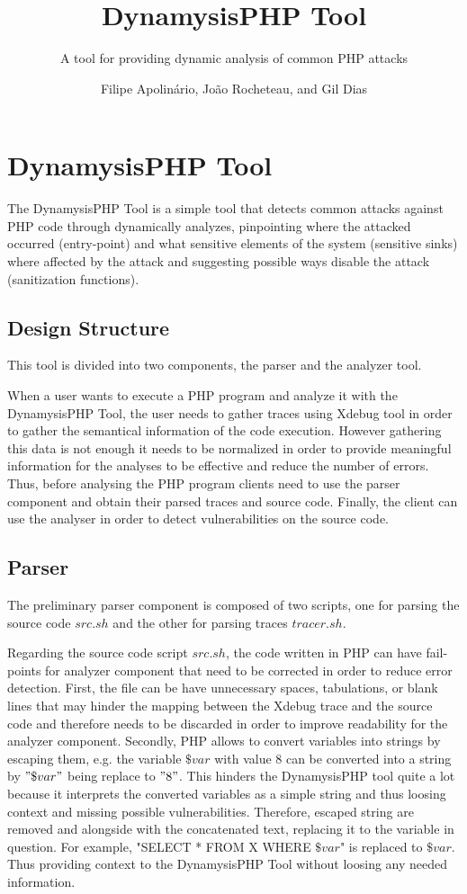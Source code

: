 \documentclass{./llncs2e/llncs}
\author{Filipe Apolinário, João Rocheteau, and Gil Dias}
\institute{Instituto Superior Técnico}
\begin{document}
\title{DynamysisPHP Tool}
\subtitle{A tool for providing dynamic analysis of common PHP attacks}

\maketitle
\section{DynamysisPHP Tool}

The DynamysisPHP Tool is a simple tool that detects common attacks against PHP code through dynamically analyzes, pinpointing where the attacked occurred (entry-point) and what sensitive elements of the system (sensitive sinks) where affected by the attack and suggesting possible ways disable the attack (sanitization functions). 

\subsection{Design Structure}
This tool is divided into two components, the parser and the analyzer tool.

When a user wants to execute a PHP program and analyze it with the DynamysisPHP Tool, the user needs to gather traces using Xdebug tool in order to gather the semantical information of the code execution. However gathering this data is not enough it needs to be normalized in order to provide meaningful information for the analyses to be effective and reduce the number of errors. Thus, before analysing the PHP program clients need to use the parser component and obtain their parsed traces and source code. Finally, the client can use the analyser in order to detect vulnerabilities on the source code.

\subsection{Parser}
The preliminary parser component is composed of two scripts, one for parsing the source code $src.sh$ and the other for parsing traces $tracer.sh$.

Regarding the source code script $src.sh$, the code written in PHP can have fail-points for analyzer component that need to be corrected in order to reduce error detection. First, the file can be have unnecessary spaces, tabulations, or blank lines that may hinder the mapping between the Xdebug trace and the source code and therefore needs to be discarded in order to improve readability for the analyzer component. Secondly, PHP allows to convert variables into strings by escaping them, e.g. the variable $\$var$ with value $8$ can be converted into a string by $"\$var"$ being replace to $"8"$. This hinders the DynamysisPHP tool quite a lot because it interprets the converted variables as a simple string and thus loosing context and missing possible vulnerabilities. Therefore, escaped string are removed and alongside with the concatenated text, replacing it to the variable in question. For example, "SELECT * FROM X WHERE $\$var$" is replaced to $\$var$. Thus providing context to the DynamysisPHP Tool without loosing any needed information. 
\end{document}
